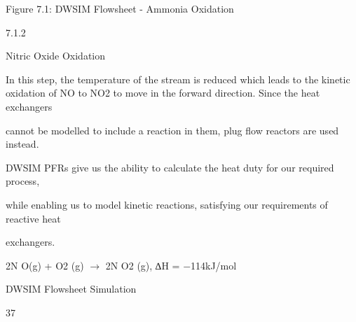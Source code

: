 \documentclass[a4paper,portrait,12pt]{article}
\begin{document}
\begin{flushleft}
Figure 7.1: DWSIM Flowsheet - Ammonia Oxidation
\end{flushleft}





7.1.2





\begin{flushleft}
Nitric Oxide Oxidation
\end{flushleft}





\begin{flushleft}
In this step, the temperature of the stream is reduced which leads to the kinetic oxidation of NO to NO2 to move in the forward direction. Since the heat exchangers
\end{flushleft}


\begin{flushleft}
cannot be modelled to include a reaction in them, plug flow reactors are used instead.
\end{flushleft}


\begin{flushleft}
DWSIM PFRs give us the ability to calculate the heat duty for our required process,
\end{flushleft}


\begin{flushleft}
while enabling us to model kinetic reactions, satisfying our requirements of reactive heat
\end{flushleft}


\begin{flushleft}
exchangers.
\end{flushleft}


\begin{flushleft}
2N O(g) + O2 (g) $\rightarrow$ 2N O2 (g), ∆H = $-$114kJ/mol
\end{flushleft}





\begin{flushleft}
\newpage
DWSIM Flowsheet Simulation
\end{flushleft}





37
\end{document}
